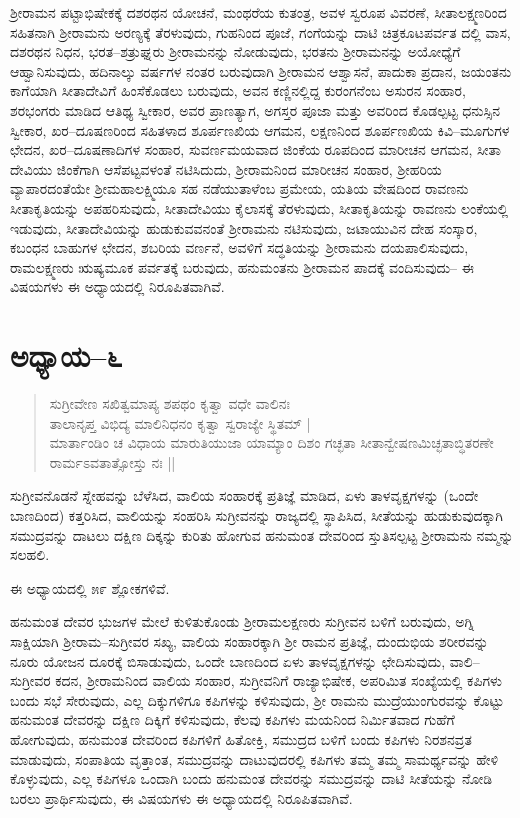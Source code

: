 ಶ‍್ರೀರಾಮನ ಪಟ್ಟಾಭಿಷೇಕಕ್ಕೆ ದಶರಥನ ಯೋಚನೆ, ಮಂಥರೆಯ ಕುತಂತ್ರ, ಅವಳ ಸ್ವರೂಪ ವಿವರಣೆ, ಸೀತಾಲಕ್ಷ್ಮಣರಿಂದ ಸಹಿತನಾಗಿ ಶ‍್ರೀರಾಮನು ಅರಣ್ಯಕ್ಕೆ ತೆರಳುವುದು, ಗುಹನಿಂದ ಪೂಜೆ, ಗಂಗೆಯನ್ನು ದಾಟಿ ಚಿತ್ರಕೂಟಪರ್ವತ ದಲ್ಲಿ ವಾಸ, ದಶರಥನ ನಿಧನ, ಭರತ–ಶತ್ರುಘ್ನರು ಶ‍್ರೀರಾಮನನ್ನು ನೋಡುವುದು, ಭರತನು ಶ‍್ರೀರಾಮನನ್ನು ಅಯೋಧ್ಯೆಗೆ ಆಹ್ವಾನಿಸುವುದು, ಹದಿನಾಲ್ಕು ವರ್ಷಗಳ ನಂತರ ಬರುವುದಾಗಿ ಶ‍್ರೀರಾಮನ ಆಶ್ವಾಸನೆ, ಪಾದುಕಾ ಪ್ರದಾನ, ಜಯಂತನು ಕಾಗೆಯಾಗಿ ಸೀತಾದೇವಿಗೆ ಹಿಂಸೆಕೊಡಲು ಬರುವುದು, ಅವನ ಕಣ್ಣಿನಲ್ಲಿದ್ದ ಕುರಂಗನೆಂಬ ಅಸುರನ ಸಂಹಾರ, ಶರಭಂಗರು ಮಾಡಿದ ಆತಿಥ್ಯ ಸ್ವೀಕಾರ, ಅವರ ಪ್ರಾಣತ್ಯಾಗ, ಅಗಸ್ತರ ಪೂಜಾ ಮತ್ತು ಅವರಿಂದ ಕೊಡಲ್ಪಟ್ಟ ಧನುಸ್ಸಿನ ಸ್ವೀಕಾರ, ಖರ–ದೂಷಣರಿಂದ ಸಹಿತಳಾದ ಶೂರ್ಪಣಖಿಯ ಆಗಮನ, ಲಕ್ಷಣನಿಂದ ಶೂರ್ಪಣಖಿಯ ಕಿವಿ–ಮೂಗುಗಳ ಛೇದನ, ಖರ–ದೂಷಣಾದಿಗಳ ಸಂಹಾರ, ಸುವರ್ಣಮಯವಾದ ಜಿಂಕೆಯ ರೂಪದಿಂದ ಮಾರೀಚನ ಆಗಮನ, ಸೀತಾ ದೇವಿಯು ಜಿಂಕೆಗಾಗಿ ಆಸೆಪಟ್ಟವಳಂತೆ ನಟಿಸಿದುದು, ಶ‍್ರೀರಾಮನಿಂದ ಮಾರೀಚನ ಸಂಹಾರ, ಶ‍್ರೀಹರಿಯ ವ್ಯಾಪಾರದಂತೆಯೇ ಶ‍್ರೀಮಹಾಲಕ್ಷ್ಮಿಯೂ ಸಹ ನಡೆಯುತಾಳೆಂಬ ಪ್ರಮೇಯ, ಯತಿಯ ವೇಷದಿಂದ ರಾವಣನು ಸೀತಾಕೃತಿಯನ್ನು ಅಪಹರಿಸುವುದು, ಸೀತಾದೇವಿಯು ಕೈಲಾಸಕ್ಕೆ ತೆರಳುವುದು, ಸೀತಾಕೃತಿಯನ್ನು ರಾವಣನು ಲಂಕೆಯಲ್ಲಿ ಇಡುವುದು, ಸೀತಾದೇವಿಯನ್ನು ಹುಡುಕುವವನಂತೆ ಶ‍್ರೀರಾಮನು ನಟಿಸುವುದು, ಜಟಾಯುವಿನ ದೇಹ ಸಂಸ್ಕಾರ, ಕಬಂಧನ ಬಾಹುಗಳ ಛೇದನ, ಶಬರಿಯ ವರ್ಣನೆ, ಅವಳಿಗೆ ಸದ್ಧತಿಯನ್ನು ಶ‍್ರೀರಾಮನು ದಯಪಾಲಿಸುವುದು, ರಾಮಲಕ್ಷ್ಮಣರು ಋಷ್ಯಮೂಕ ಪರ್ವತಕ್ಕೆ ಬರುವುದು, ಹನುಮಂತನು ಶ‍್ರೀರಾಮನ ಪಾದಕ್ಕೆ ವಂದಿಸುವುದು– ಈ ವಿಷಯಗಳು ಈ ಅಧ್ಯಾಯದಲ್ಲಿ ನಿರೂಪಿತವಾಗಿವೆ.


\section{ಅಧ್ಯಾಯ–೬}

\begin{verse}
ಸುಗ್ರೀವೇಣ ಸಖಿತ್ವಮಾಪ್ಯ ಶಪಥಂ ಕೃತ್ವಾ ವಧೇ ವಾಲಿನಃ\\ ತಾಲಾನೃಪ್ತ ವಿಭಿದ್ಯ ಮಾಲಿನಿಧನಂ ಕೃತ್ವಾ ಸ್ವರಾಜ್ಯೇ ಸ್ಥಿತಮ್ |\\ ಮಾರ್ತಾಂಡಿಂ ಚ ವಿಧಾಯ ಮಾರುತಿಯುಜಾ ಯಾಮ್ಯಾಂ ದಿಶಂ ಗಚ್ಛತಾ ಸೀತಾನ್ವೇಷಣಮಿಚ್ಛತಾಬ್ಧಿತರಣೇ ರಾರ್ಮಽವತಾತ್ಸೋಸ್ತು ನಃ ||
\end{verse}

ಸುಗ್ರೀವನೊಡನೆ ಸ್ನೇಹವನ್ನು ಬೆಳೆಸಿದ, ವಾಲಿಯ ಸಂಹಾರಕ್ಕೆ ಪ್ರತಿಜ್ಞೆ ಮಾಡಿದ, ಏಳು ತಾಳವೃಕ್ಷಗಳನ್ನು (ಒಂದೇ ಬಾಣದಿಂದ) ಕತ್ತರಿಸಿದ, ವಾಲಿಯನ್ನು ಸಂಹರಿಸಿ ಸುಗ್ರೀವನನ್ನು ರಾಜ್ಯದಲ್ಲಿ ಸ್ಥಾಪಿಸಿದ, ಸೀತೆಯನ್ನು ಹುಡುಕುವುದಕ್ಕಾಗಿ ಸಮುದ್ರವನ್ನು ದಾಟಲು ದಕ್ಷಿಣ ದಿಕ್ಕನ್ನು ಕುರಿತು ಹೋಗುವ ಹನುಮಂತ ದೇವರಿಂದ ಸ್ತುತಿಸಲ್ಪಟ್ಟ ಶ‍್ರೀರಾಮನು ನಮ್ಮನ್ನು ಸಲಹಲಿ.

ಈ ಅಧ್ಯಾಯದಲ್ಲಿ ೫೯ ಶ್ಲೋಕಗಳಿವೆ.

ಹನುಮಂತ ದೇವರ ಭುಜಗಳ ಮೇಲೆ ಕುಳಿತುಕೊಂಡು ಶ‍್ರೀರಾಮಲಕ್ಷಣರು ಸುಗ್ರೀವನ ಬಳಿಗೆ ಬರುವುದು, ಅಗ್ನಿ ಸಾಕ್ಷಿಯಾಗಿ ಶ‍್ರೀರಾಮ–ಸುಗ್ರೀವರ ಸಖ್ಯ, ವಾಲಿಯ ಸಂಹಾರಕ್ಕಾಗಿ ಶ‍್ರೀ ರಾಮನ ಪ್ರತಿಜ್ಞೆ, ದುಂದುಭಿಯ ಶರೀರವನ್ನು ನೂರು ಯೋಜನ ದೂರಕ್ಕೆ ಬಿಸಾಡುವುದು, ಒಂದೇ ಬಾಣದಿಂದ ಏಳು ತಾಳವೃಕ್ಷಗಳನ್ನು ಛೇದಿಸುವುದು, ವಾಲಿ–ಸುಗ್ರೀವರ ಕದನ, ಶ‍್ರೀರಾಮನಿಂದ ವಾಲಿಯ ಸಂಹಾರ, ಸುಗ್ರೀವನಿಗೆ ರಾಜ್ಯಾಭಿಷೇಕ, ಅಪರಿಮಿತ ಸಂಖ್ಯೆಯಲ್ಲಿ ಕಪಿಗಳು ಬಂದು ಸಭೆ ಸೇರುವುದು, ಎಲ್ಲ ದಿಕ್ಕುಗಳಿಗೂ ಕಪಿಗಳನ್ನು ಕಳಿಸುವುದು, ಶ‍್ರೀ ರಾಮನು ಮುದ್ರೆಯುಂಗುರವನ್ನು ಕೊಟ್ಟು ಹನುಮಂತ ದೇವರನ್ನು ದಕ್ಷಿಣ ದಿಕ್ಕಿಗೆ ಕಳಿಸುವುದು, ಕೆಲವು ಕಪಿಗಳು ಮಯನಿಂದ ನಿರ್ಮಿತವಾದ ಗುಹೆಗೆ ಹೋಗುವುದು, ಹನುಮಂತ ದೇವರಿಂದ ಕಪಿಗಳಿಗೆ ಹಿತೋಕ್ತಿ, ಸಮುದ್ರದ ಬಳಿಗೆ ಬಂದು ಕಪಿಗಳು ನಿರಶನವ್ರತ ಮಾಡುವುದು, ಸಂಪಾತಿಯ ವೃತ್ತಾಂತ, ಸಮುದ್ರವನ್ನು ದಾಟುವುದರಲ್ಲಿ ಕಪಿಗಳು ತಮ್ಮ ತಮ್ಮ ಸಾಮರ್ಥ್ಯವನ್ನು ಹೇಳಿ ಕೊಳ್ಳುವುದು, ಎಲ್ಲ ಕಪಿಗಳೂ ಒಂದಾಗಿ ಬಂದು ಹನುಮಂತ ದೇವರನ್ನು ಸಮುದ್ರವನ್ನು ದಾಟಿ ಸೀತೆಯನ್ನು ನೋಡಿ ಬರಲು ಪ್ರಾರ್ಥಿಸುವುದು, ಈ ವಿಷಯಗಳು ಈ ಅಧ್ಯಾಯದಲ್ಲಿ ನಿರೂಪಿತವಾಗಿವೆ.


